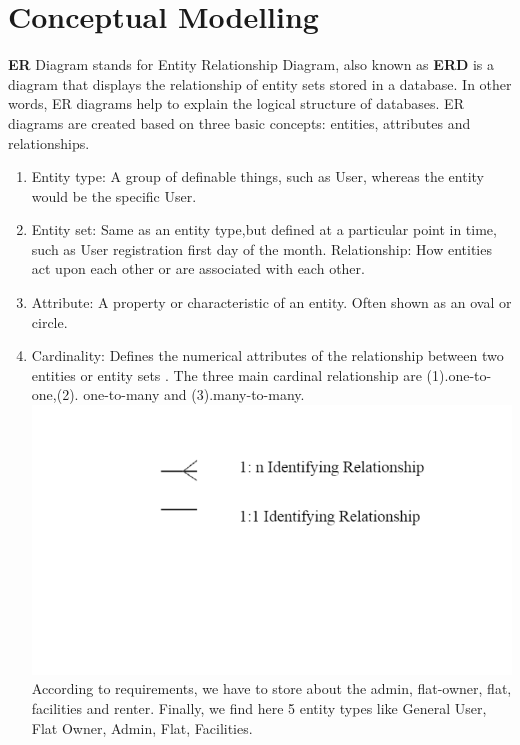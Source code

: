 \section{Conceptual Modelling}\label{sec:cm}
\textbf{ER} Diagram stands for Entity Relationship Diagram, also known as \textbf{ERD} is a diagram that
displays the relationship of entity sets stored in a database. In other words, ER diagrams help to explain the logical structure of databases. ER diagrams are created based on
 three basic concepts: entities, attributes and relationships.
 \begin{enumerate}
    
\item Entity type: A group of definable things, such as User, whereas the entity would be the specific User. 
\item Entity set: Same as an entity type,but defined at a particular point in time, such
as User registration first day of the month.
Relationship: How entities act upon each other or are associated with each other.
\item Attribute: A property or characteristic of an entity. Often shown as an
oval or circle.
\item Cardinality: Defines the numerical attributes of the relationship between
two entities or entity sets . The three main cardinal relationship are (1).one-to-one,(2). 
one-to-many and (3).many-to-many.\\
\includegraphics[width=1\textwidth, inner]{relationship.png}\\
According to requirements, we have to store about the admin, flat-owner, flat, facilities and renter. Finally, we find here 5 entity types like General User, Flat Owner, Admin, Flat, Facilities.


\end{enumerate}
